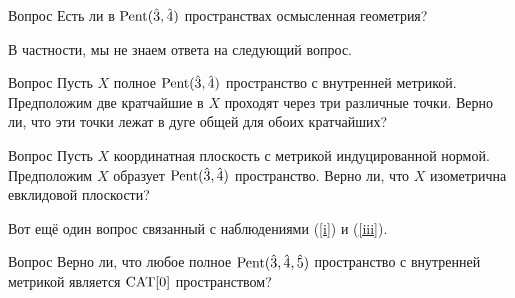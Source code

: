 \documentclass{article}
\begin{document}
\begin{thm}{Вопрос}
Есть ли в $\text{\rm Pent}(\hat 3,\hat 4)$ пространствах осмысленная геометрия?
\end{thm}

В частности, мы не знаем ответа на следующий вопрос.

\begin{thm}{Вопрос}
Пусть $X$ полное $\text{\rm Pent}(\hat 3,\hat 4)$ пространство с внутренней метрикой.
Предположим две кратчайшие в $X$ проходят через три различные точки.
Верно ли, что эти точки лежат в дуге общей для обоих кратчайших?
\end{thm}

\begin{thm}{Вопрос}
Пусть $X$ координатная плоскость с метрикой индуцированной нормой.
Предположим $X$ образует $\text{\rm Pent}(\hat 3,\hat 4)$ пространство.
Верно ли, что $X$ изометрична евклидовой плоскости?
\end{thm}

Вот ещё один вопрос связанный с наблюдениями (\ref{i}) и (\ref{iii}).

\begin{thm}{Вопрос}
Верно ли, что любое полное $\text{\rm Pent}(\hat 3,\hat 4,\hat 5)$ пространство с внутренней метрикой является $\mathrm{CAT}[0]$ пространством?
\end{thm} 
\end{document}
